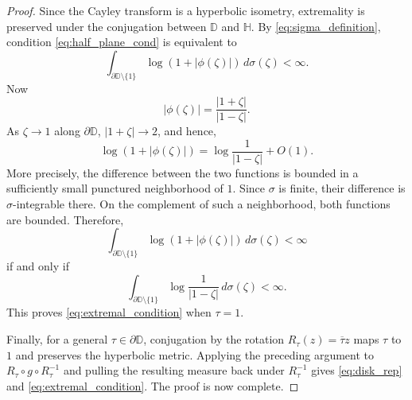 \documentclass[10pt,a4paper]{amsart}
\numberwithin{equation}{section}
\begin{document}
\begin{proof}
Since the Cayley transform is a hyperbolic isometry, extremality is
preserved under the conjugation between $\mathbb{D}$ and $\mathbb{H}$.
By \eqref{eq:sigma_definition}, condition \eqref{eq:half_plane_cond}
is equivalent to
\begin{equation*}
\int_{\partial\mathbb{D}\setminus\{1\}}
\log(1+|\phi(\zeta)|)\,d\sigma(\zeta)<\infty.
\end{equation*}
Now
\begin{equation*}
|\phi(\zeta)|
=
\frac{|1+\zeta|}{|1-\zeta|}.
\end{equation*}
As $\zeta\to1$ along $\partial\mathbb{D}$,
$|1+\zeta|\to2$, and hence,
\begin{equation*}
\log(1+|\phi(\zeta)|)
=
\log\frac{1}{|1-\zeta|}+O(1).
\end{equation*}
More precisely, the difference between the two functions is bounded
in a sufficiently small punctured neighborhood of $1$. Since $\sigma$
is finite, their difference is $\sigma$-integrable there. On the
complement of such a neighborhood, both functions are bounded.
Therefore,
\begin{equation*}
\int_{\partial\mathbb{D}\setminus\{1\}}
\log(1+|\phi(\zeta)|)\,d\sigma(\zeta)<\infty
\end{equation*}
if and only if
\begin{equation*}
\int_{\partial\mathbb{D}\setminus\{1\}}
\log\frac{1}{|1-\zeta|}\,d\sigma(\zeta)<\infty.
\end{equation*}
This proves \eqref{eq:extremal_condition} when $\tau=1$.

Finally, for a general $\tau\in\partial\mathbb{D}$, conjugation by the
rotation $R_\tau(z)=\overline{\tau}z$ maps $\tau$ to $1$ and preserves
the hyperbolic metric. Applying the preceding argument to
$R_\tau\circ g\circ R_\tau^{-1}$ and pulling the resulting measure back
under $R_\tau^{-1}$ gives \eqref{eq:disk_rep} and
\eqref{eq:extremal_condition}. The proof is now complete.
\end{proof}



\end{document}

